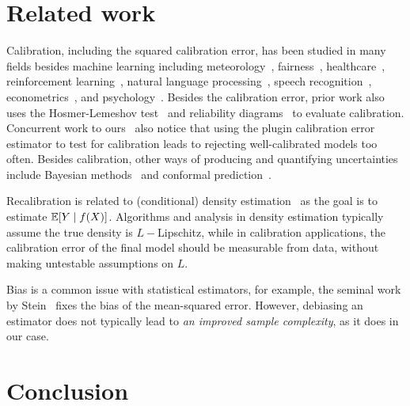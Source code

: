 \section{Related work}

Calibration, including the squared calibration error, has been studied in many fields besides machine learning including meteorology~\cite{murphy1973vector, murphy1977reliability, degroot1983forecasters,gneiting2005weather, brocker2009decomposition}, fairness~\cite{johnson2018multicalibration, liu2019implicit}, healthcare~\cite{jiang2012calibrating, crowson2017calibration, harrell1996prognostic, yadlowsky2019calibration}, reinforcement learning~\cite{malik2019calibrated}, natural language processing~\cite{nguyen2015posterior, card2018calibration}, speech recognition~\cite{dong2011calibration}, econometrics~\cite{gneiting2007probabilistic}, and psychology~\cite{lichtenstein1982calibration}.
Besides the calibration error, prior work also uses the Hosmer-Lemeshov test~\cite{hosmer1980goodness} and reliability diagrams~\cite{degroot1983forecasters, brocker2007reliability} to evaluate calibration.
Concurrent work to ours~\cite{widmann2019calibration} also notice that using the plugin calibration error estimator to test for calibration leads to rejecting well-calibrated models too often.
Besides calibration, other ways of producing and quantifying uncertainties include Bayesian methods~\cite{gelman1995bayesian} and conformal prediction~\cite{shafer2008tutorial, lei2016distribution}.

Recalibration is related to (conditional) density estimation~\cite{wasserman2019, parzen1962} as the goal is to estimate $\mathbb{E}[Y \mid f(X)]$.
Algorithms and analysis in density estimation typically assume the true density is $L-$Lipschitz, while in calibration applications, the calibration error of the final model should be measurable from data, without making untestable assumptions on $L$.


Bias is a common issue with statistical estimators, for example, the seminal work by Stein~\cite{stein81sure} fixes the bias of the mean-squared error. However, debiasing an estimator does not typically lead to \emph{an improved sample complexity}, as it does in our case.

\section{Conclusion}

